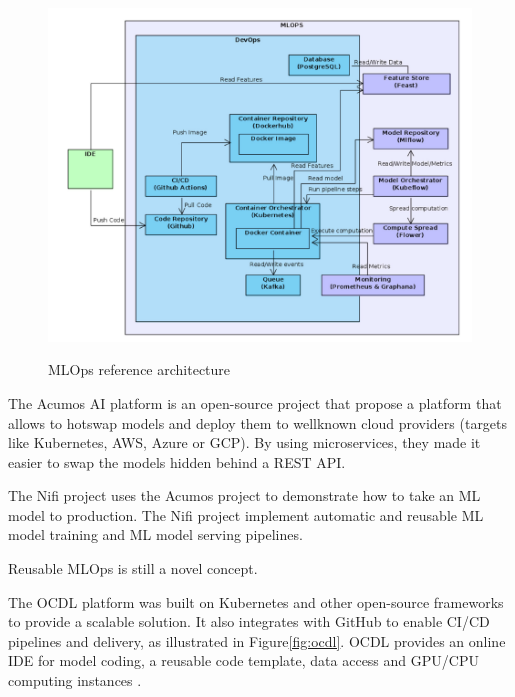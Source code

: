 \begin{figure}[!htbp]
    \caption{MLOps reference architecture\cite{10855428}}
    \centering
    \includegraphics[scale=0.5]{images/infrastructure}
    \label{fig:infra}
\end{figure}


The Acumos AI platform\cite{10690392} is an open-source project that propose a platform that allows to hotswap models and deploy
them to wellknown cloud providers (targets like Kubernetes, AWS, Azure or GCP).
By using microservices, they made it easier to swap the models hidden behind a REST API\@.

The Nifi project\cite{10346079} uses the Acumos project to demonstrate how to take an ML model
to production.
The Nifi project implement automatic and reusable ML model training and ML model serving pipelines.

Reusable MLOps is still a novel concept\cite{10690392}.

The OCDL platform\cite{LIU2020704} was built on Kubernetes and other open-source frameworks to provide a scalable solution.
It also integrates with GitHub to enable CI/CD pipelines and delivery, as illustrated in Figure\ref{fig:ocdl}.
OCDL provides an online IDE for model coding, a reusable code template, data access and GPU/CPU computing instances\cite{LIU2020704} .

